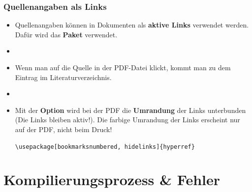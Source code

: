 \begin{frame}[fragile]
\frametitle{Quellenangaben als Links}

\begin{itemize}
	\item Quellenangaben können in Dokumenten als \textbf{aktive Links} verwendet werden. Dafür wird das \textbf{Paket } verwendet.
	
	\item[]
	
	\item Wenn man auf die Quelle in der PDF-Datei klickt, kommt man zu dem Eintrag im Literaturverzeichnis.
	
	\item[]	
	\item Mit der \textbf{Option } wird bei der PDF die \textbf{Umrandung} der Links unterbunden (Die Links bleiben aktiv!). Die farbige Umrandung der Links erscheint nur auf der PDF, nicht beim Druck! 
	
	\lstinline|\usepackage[bookmarksnumbered, hidelinks]{hyperref}|
\end{itemize}

\end{frame}


\section{Kompilierungsprozess \& Fehler}

